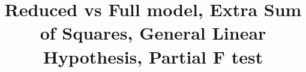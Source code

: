\title{Reduced vs Full model, Extra Sum of Squares, General Linear Hypothesis, Partial F test}
\date{}
